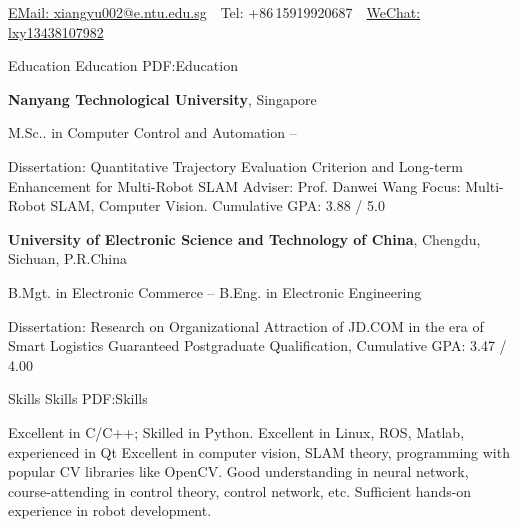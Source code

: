\documentclass[letterpaper,MMMyyyy,nonstopmode]{simpleresumecv}
\newcommand{\CVAuthor}{Xiangyu Liu}
\newcommand{\CVWebpage}{http://www.example.com/~johndoe}
\begin{document}

\Title{\CVAuthor}

\begin{SubTitle}
\par
\href{xiangyu002@e.ntu.edu.sg}
{EMail: xiangyu002@e.ntu.edu.sg}
\,\SubBulletSymbol\,
Tel: +86\,15919920687
\,\SubBulletSymbol\,
\href{\CVWebpage}
{WeChat: lxy13438107982}
\end{SubTitle}

\begin{Body}


\Section
{Education}
{Education}
{PDF:Education}

\Entry
{\textbf{Nanyang Technological University}},
Singapore

\Gap
\BulletItem
M.Sc.. in
{Computer Control and Automation}
\hfill
{} --
\begin{Detail}
\SubBulletItem
Dissertation:
{Quantitative Trajectory Evaluation Criterion and Long-term Enhancement for Multi-Robot SLAM}
\SubBulletItem
Adviser:
Prof. Danwei Wang
\SubBulletItem
Focus:
Multi-Robot SLAM, Computer Vision.
\SubBulletItem
Cumulative GPA: 3.88 / 5.0
\end{Detail}

\BigGap
\Entry
{\textbf{University of Electronic Science and Technology of China}},
Chengdu, Sichuan, P.R.China

\Gap
\BulletItem
B.Mgt. in 
{Electronic Commerce}
\hfill
{} --
\BulletItem
B.Eng. in 
{Electronic Engineering}
\begin{Detail}
\SubBulletItem
Dissertation:
	{Research on Organizational Attraction of JD.COM in the era of Smart Logistics}
\SubBulletItem
Guaranteed Postgraduate Qualification,
\SubBulletItem
Cumulative GPA: 3.47 / 4.00
\end{Detail}


\Section
{Skills}
{Skills}
{PDF:Skills}

\Entry
\BulletItem
Excellent in C/C++; Skilled in Python.
\BulletItem
Excellent in Linux, ROS, Matlab, experienced in Qt
\BulletItem
Excellent in computer vision, SLAM theory, programming with popular CV libraries like OpenCV.
\BulletItem
Good understanding in neural network, course-attending in control theory, control network, etc.
\BulletItem
Sufficient hands-on experience in robot development.


\end{Body}
\end{document}

